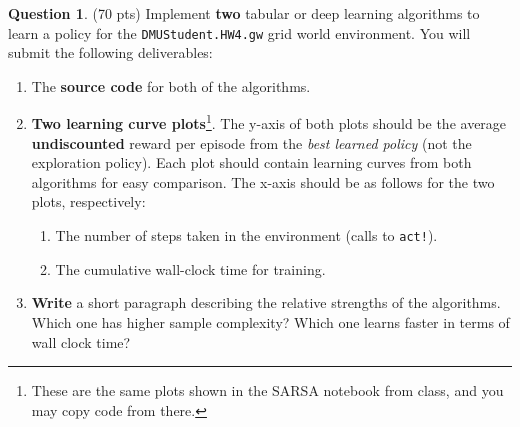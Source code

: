 \documentclass{article}
\theoremstyle{definition}
\newtheorem{question}[thm]{Question}
\begin{document}
\begin{question}
    (70 pts) Implement \textbf{two} tabular or deep learning algorithms to learn a policy for the \texttt{DMUStudent.HW4.gw} grid world environment.     You will submit the following deliverables:

    \begin{enumerate}[label=\alph*)]
        \item The \textbf{source code} for both of the algorithms.
        \item \textbf{Two learning curve plots}\footnote{These are the same plots shown in the SARSA notebook from class, and you may copy code from there.}.  The y-axis of both plots should be the average \textbf{undiscounted} reward per episode from the \emph{best learned policy} (not the exploration policy). Each plot should contain learning curves from both algorithms for easy comparison. The x-axis should be as follows for the two plots, respectively:
            \begin{enumerate}[label=\arabic*)]
                \item The number of steps taken in the environment (calls to \texttt{act!}).
                \item The cumulative wall-clock time for training.
            \end{enumerate}
        \item \textbf{Write} a short paragraph describing the relative strengths of the algorithms. Which one has higher sample complexity? Which one learns faster in terms of wall clock time?
    \end{enumerate}
\end{question}
\end{document}
